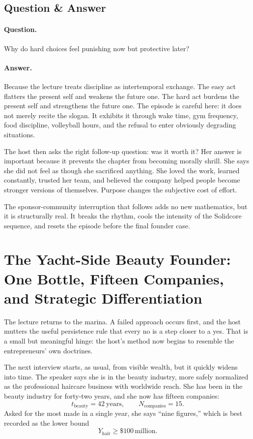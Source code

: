 \subsection{Question \& Answer}

\paragraph{Question.}
Why do hard choices feel punishing now but protective later?

\paragraph{Answer.}
Because the lecture treats discipline as intertemporal exchange. The easy act flatters the present self and weakens the future one. The hard act burdens the present self and strengthens the future one. The episode is careful here: it does not merely recite the slogan. It exhibits it through wake time, gym frequency, food discipline, volleyball hours, and the refusal to enter obviously degrading situations.

The host then asks the right follow-up question: was it worth it? Her answer is important because it prevents the chapter from becoming morally shrill. She says she did not feel as though she sacrificed anything. She loved the work, learned constantly, trusted her team, and believed the company helped people become stronger versions of themselves. Purpose changes the subjective cost of effort.

The sponsor-community interruption that follows adds no new mathematics, but it is structurally real. It breaks the rhythm, cools the intensity of the Solidcore sequence, and resets the episode before the final founder case.

\section{The Yacht-Side Beauty Founder: One Bottle, Fifteen Companies, and Strategic Differentiation}

The lecture returns to the marina. A failed approach occurs first, and the host mutters the useful persistence rule that every no is a step closer to a yes. That is a small but meaningful hinge: the host's method now begins to resemble the entrepreneurs' own doctrines.

The next interview starts, as usual, from visible wealth, but it quickly widens into time. The speaker says she is in the beauty industry, more safely normalized as the professional haircare business with worldwide reach. She has been in the beauty industry for forty-two years, and she now has fifteen companies:
\begin{equation}
t_{\text{beauty}} = 42\ \text{years},
\qquad
N_{\text{companies}} = 15.
\end{equation}
Asked for the most made in a single year, she says ``nine figures,'' which is best recorded as the lower bound
\begin{equation}
Y_{\text{hair}} \ge \$100\,\text{million}.
\end{equation}

